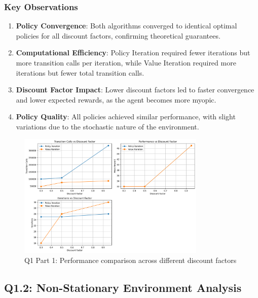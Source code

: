 \documentclass[10pt,a4paper]{article}
\begin{document}
\subsubsection{Key Observations}

\begin{enumerate}
    \item \textbf{Policy Convergence}: Both algorithms converged to identical optimal policies for all discount factors, confirming theoretical guarantees.
    
    \item \textbf{Computational Efficiency}: Policy Iteration required fewer iterations but more transition calls per iteration, while Value Iteration required more iterations but fewer total transition calls.
    
    \item \textbf{Discount Factor Impact}: Lower discount factors led to faster convergence and lower expected rewards, as the agent becomes more myopic.
    
    \item \textbf{Policy Quality}: All policies achieved similar performance, with slight variations due to the stochastic nature of the environment.
\end{enumerate}

\begin{figure}[H]
\centering
\includegraphics[width=0.8\textwidth]{../Q1/part1/q1_part1_results.png}
\caption{Q1 Part 1: Performance comparison across different discount factors}
\end{figure}

\clearpage
\subsection{Q1.2: Non-Stationary Environment Analysis}
\end{document}
